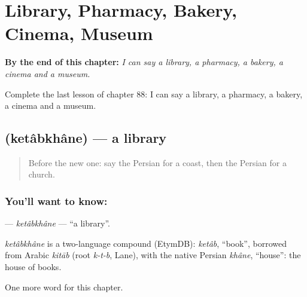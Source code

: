 
\chapter{Library, Pharmacy, Bakery, Cinema, Museum}
\label{ch:fa-library-pharmacy-bakery-cinema-museum}

\begin{chapteropening}
\textbf{By the end of this chapter:} \emph{I can say a library, a pharmacy, a bakery, a cinema and a museum.}

Complete the last lesson of chapter 88: I can say a library, a pharmacy, a bakery, a cinema and a museum.
\end{chapteropening}

\section[\texorpdfstring{\fa{کتابخانه} (ketâbkhâne)}{کتابخانه (ketâbkhâne)}]{ (ketâbkhâne) — a library}

\label{lesson:FA-C88-ketabkhane}



\begin{quote}
Before the new one: say the Persian for a coast, then the Persian for a church.
\end{quote}

\subsection*{You'll want to know: }
\textbf{} — \emph{ketâbkhâne} — \textquotedblleft{}a library\textquotedblright{}.

\begin{cousinweb}
\emph{ketâbkhâne} is a two-language compound (EtymDB): \emph{ketâb}, \textquotedblleft{}book\textquotedblright{}, borrowed from Arabic \emph{kitāb} (root \emph{k-t-b}, Lane), with the native Persian \emph{khâne}, \textquotedblleft{}house\textquotedblright{}: the house of books.
\end{cousinweb}

\begin{grammarlens}[title={What you've built}]
One more word for this chapter.
\end{grammarlens}

